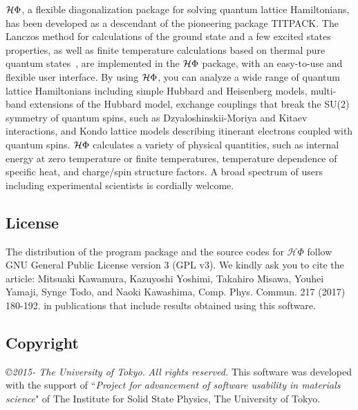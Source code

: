 $\mathcal{H} \Phi$, a flexible diagonalization package for solving quantum lattice Hamiltonians,
has been developed as a descendant of the pioneering package TITPACK.
The Lanczos method for calculations of the ground state and a few excited states properties,
as well as finite temperature calculations based on thermal pure quantum states~\cite{Sugiura2012},
are implemented in
the $\mathcal{H} \Phi$ package, with an easy-to-use and flexible user interface.
By using $\mathcal{H} \Phi$, you can analyze a wide range of quantum lattice Hamiltonians including
simple Hubbard and Heisenberg models, multi-band extensions of the Hubbard model,
exchange couplings that break the SU(2) symmetry of quantum spins, such as Dzyaloshinskii-Moriya
and Kitaev interactions, and Kondo lattice models describing itinerant electrons coupled with
quantum spins. $\mathcal{H} \Phi$ calculates a variety of physical quantities, such as internal energy at zero temperature or finite temperatures, temperature dependence of specific heat, and charge/spin structure factors.
A broad spectrum of users including experimental scientists is cordially welcome.

\subsection{License}
The distribution of the program package and the source codes for ${\mathcal H \Phi}$ follow GNU General Public License version 3 (GPL v3). 
We kindly ask you to cite the article:
Mitsuaki Kawamura, Kazuyoshi Yoshimi, Takahiro Misawa, Youhei Yamaji, Synge Todo, and Naoki Kawashima, 
Comp. Phys. Commun. 217 (2017) 180-192. in publications that include results obtained using this software.


\subsection{Copyright}
{\it \copyright 2015- The University of Tokyo.} {\it  All rights reserved.}
This software was developed with the support of ``{\it Project for advancement of software usability in materials science}" of The Institute for Solid State Physics, The University of Tokyo. 
